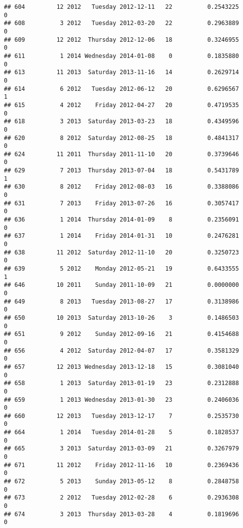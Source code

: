 \documentclass[
]{article}
\begin{document}
\begin{verbatim}
## 604         12 2012   Tuesday 2012-12-11   22          0.2543225             0
## 608          3 2012   Tuesday 2012-03-20   22          0.2963889             0
## 609         12 2012  Thursday 2012-12-06   18          0.3246955             0
## 611          1 2014 Wednesday 2014-01-08    0          0.1835880             0
## 613         11 2013  Saturday 2013-11-16   14          0.2629714             0
## 614          6 2012   Tuesday 2012-06-12   20          0.6296567             1
## 615          4 2012    Friday 2012-04-27   20          0.4719535             0
## 618          3 2013  Saturday 2013-03-23   18          0.4349596             0
## 620          8 2012  Saturday 2012-08-25   18          0.4841317             0
## 624         11 2011  Thursday 2011-11-10   20          0.3739646             0
## 629          7 2013  Thursday 2013-07-04   18          0.5431789             1
## 630          8 2012    Friday 2012-08-03   16          0.3388086             0
## 631          7 2013    Friday 2013-07-26   16          0.3057417             0
## 636          1 2014  Thursday 2014-01-09    8          0.2356091             0
## 637          1 2014    Friday 2014-01-31   10          0.2476281             0
## 638         11 2012  Saturday 2012-11-10   20          0.3250723             0
## 639          5 2012    Monday 2012-05-21   19          0.6433555             1
## 646         10 2011    Sunday 2011-10-09   21          0.0000000             0
## 649          8 2013   Tuesday 2013-08-27   17          0.3138986             0
## 650         10 2013  Saturday 2013-10-26    3          0.1486503             0
## 651          9 2012    Sunday 2012-09-16   21          0.4154688             0
## 656          4 2012  Saturday 2012-04-07   17          0.3581329             0
## 657         12 2013 Wednesday 2013-12-18   15          0.3081040             0
## 658          1 2013  Saturday 2013-01-19   23          0.2312888             0
## 659          1 2013 Wednesday 2013-01-30   23          0.2406036             0
## 660         12 2013   Tuesday 2013-12-17    7          0.2535730             0
## 664          1 2014   Tuesday 2014-01-28    5          0.1828537             0
## 665          3 2013  Saturday 2013-03-09   21          0.3267979             0
## 671         11 2012    Friday 2012-11-16   10          0.2369436             0
## 672          5 2013    Sunday 2013-05-12    8          0.2848758             0
## 673          2 2012   Tuesday 2012-02-28    6          0.2936308             0
## 674          3 2013  Thursday 2013-03-28    4          0.1819696             0

\end{verbatim}
\end{document}
